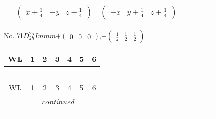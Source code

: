 \documentclass[fleqn,9pt,landscape]{jsarticle}
\begin{document}
\begin{center}
\begin{longtable}{ccccccc}
& $ \begin{pmatrix} x + \frac{1}{4} & - y & z + \frac{1}{4} \end{pmatrix} $ & $ \begin{pmatrix} - x & y + \frac{1}{4} & z + \frac{1}{4} \end{pmatrix} $ & $  $ & $  $ & $  $ & $  $ \\
\end{longtable}
\end{center}
\newpage
No. 71\quad$D_{2h}^{25}$\quad$Immm$\quad[ orthorhombic ]\quad$+\begin{pmatrix} 0 & 0 & 0 \end{pmatrix}$,\quad $+\begin{pmatrix} \frac{1}{2} & \frac{1}{2} & \frac{1}{2} \end{pmatrix}$
\begin{center}
\renewcommand{\arraystretch}{1.2}
\begin{longtable}{ccccccc}
 \hline \hline
WL & 1 & 2 & 3 & 4 & 5 & 6 \\ \hline \endfirsthead

\multicolumn{6}{l}{\tablename\ \thetable{}} \\
 \hline \hline
WL & 1 & 2 & 3 & 4 & 5 & 6 \\ \hline \endhead

 \hline \hline
\multicolumn{6}{r}{\footnotesize\it continued ...} \\ \endfoot

 \hline \hline
\multicolumn{6}{r}{} \\ \endlastfoot


\end{longtable}
\end{center}
\end{document}
